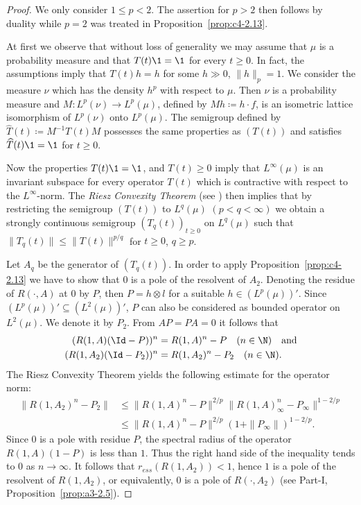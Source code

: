 \begin{proof}
We only consider $1 \leq p < 2$.
The assertion for $p > 2$ then follows by duality while $p = 2$ was treated in Proposition~\ref{prop:c4-2.13}.

At first we observe that without loss of generality we may assume that $\mu$ is a probability measure and that $T(t)\1 = \1$ for every $t \geq 0$.
In fact, the assumptions imply that $T(t)h = h$ for some $h \gg 0$, $\|h\|_{p} = 1$.
We consider the measure $\nu$ which has the density $h^{p}$ with respect to $\mu$.
Then $\nu$ is a probability measure and 
$M \colon L^{p}(\nu) \to L^{p}(\mu)$, defined by $Mh \coloneq h\cdot f$, is an isometric lattice isomorphism of\/ $L^{p}(\nu)$ onto $L^{p}(\mu)$.
The semigroup defined by $\widehat{T}(t) \coloneq M^{-1}T(t)M$ possesses the same properties as $(T(t))$ and satisfies $\widehat{T}(t)\1 = \1$ for $t \geq 0$.

Now the properties $T(t)\1 = \1$, and $T(t) \geq 0$ imply that $L^{\infty}(\mu)$ is an invariant subspace for every operator $T(t)$ which is contractive with respect to the $L^{\infty}$-norm.
The \emph{Riesz Convexity Theorem} (see \textcite[VI.10.11]{dunfordschwartz:1958}) then implies that by restricting the semigroup $(T(t))$ to $L^{q}(\mu)$ $(p < q < \infty)$ we obtain a strongly continuous semigroup $(T_{q}(t))_{t \geq 0}$ on $L^{q}(\mu)$ such that $\|T_{q}(t)\| \leq \|T(t)\|^{p/q}$ for $t \geq 0$, $q \geq p$.

Let $A_{q}$ be the generator of\/ $(T_{q}(t))$.
In order to apply Proposition~\ref{prop:c4-2.13} we have to show that $0$ is a pole of the resolvent of\/ $A_{2}$.
Denoting the residue of\/ $R(\cdot,A)$ at $0$ by $P$, then $P = h \otimes l$ for a suitable $h \in (L^{p}(\mu))'$.
Since $(L^{p}(\mu))' \subseteq (L^{2}(\mu))'$, $P$ can also be considered as bounded operator on $L^{2}(\mu)$.
We denote it by $P_{2}$.
From $AP = PA = 0$ it follows that
\begin{align*}
(R(1,A)(\Id-P))^{n} &= R(1,A)^{n} - P \quad (n \in \N) \quad \text{and} \\
(R(1,A_{2})(\Id-P_{2}))^{n} &= R(1,A_{2})^{n} - P_{2} \quad (n \in \N).
\end{align*}
The Riesz Convexity Theorem yields the following estimate for the operator norm:
\begin{align*}
\|R(1,A_{2})^{n} - P_{2}\| &\leq \|R(1,A)^{n} - P\|^{2/p}\|R(1,A)_{\infty}^{n} - P_{\infty}\|^{1-2/p} \\
&\leq \|R(1,A)^{n} - P\|^{2/p}(1 + \|P_{\infty}\|)^{1-2/p}.
\end{align*}
Since $0$ is a pole with residue $P$, the spectral radius of the operator $R(1,A)(1-P)$ is less than $1$.
Thus the right hand side of the inequality tends to $0$ as $n \to \infty$.
It follows that $r_{ess}(R(1,A_{2})) < 1$, hence $1$ is a pole of the resolvent of\/ $R(1,A_{2})$, or equivalently, $0$ is a pole of\/ $R(\cdot,A_{2})$ (see 
Part-I, Proposition~\ref{prop:a3-2.5}).


\end{proof}
